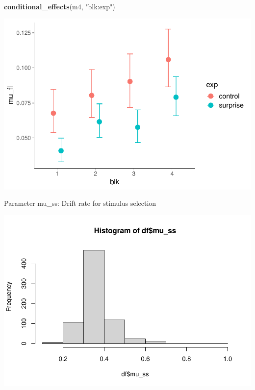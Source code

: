 \documentclass[
]{article}
\newenvironment{Shaded}{\begin{snugshade}}{\end{snugshade}}
\newcommand{\FunctionTok}[1]{\textcolor[rgb]{0.13,0.29,0.53}{\textbf{#1}}}
\newcommand{\NormalTok}[1]{#1}
\newcommand{\SpecialCharTok}[1]{\textcolor[rgb]{0.81,0.36,0.00}{\textbf{#1}}}
\newcommand{\StringTok}[1]{\textcolor[rgb]{0.31,0.60,0.02}{#1}}
\begin{document}
\begin{Shaded}
\begin{Highlighting}[]
\FunctionTok{conditional\_effects}\NormalTok{(m4, }\StringTok{"blk:exp"}\NormalTok{)}
\end{Highlighting}
\end{Shaded}

\includegraphics{params_analyses_files/figure-latex/unnamed-chunk-5-3.pdf}

Parameter mu\_ss: Drift rate for stimulus selection

\begin{Shaded}
\end{Shaded}

\includegraphics{params_analyses_files/figure-latex/unnamed-chunk-6-1.pdf}
\end{document}
